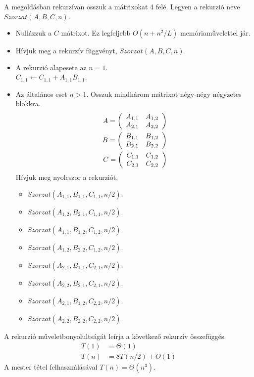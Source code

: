 \documentclass[12pt]{report}
\begin{document}
A megoldásban rekurzívan osszuk a mátrixokat 4 felé.
Legyen a rekurzió neve $Szorzat(A, B, C, n)$.
\begin{itemize}
\item Nullázzuk a $C$ mátrixot.
Ez legfeljebb $O(n+n^2/L)$ memóriaművelettel jár.
\item Hívjuk meg a rekurzív függvényt, $Szorzat(A, B, C, n)$.
\item A rekurzió alapesete az $n=1$. \\
$C_{1,1} \leftarrow C_{1,1} + A_{1,1} B_{1,1}$.
\item Az általános eset $n > 1$.
Osszuk mindhárom mátrixot négy-négy négyzetes blokkra.
\begin{align*}
A=\left(
\begin{array}{c c}  
A_{1,1} & A_{1,2} \\
A_{2,1} & A_{2,2}
\end{array}
\right) \\
B=\left(
\begin{array}{c c}  
B_{1,1} & B_{1,2} \\
B_{2,1} & B_{2,2}
\end{array}
\right) \\
C=\left(
\begin{array}{c c}  
C_{1,1} & C_{1,2} \\
C_{2,1} & C_{2,2}
\end{array}
\right)
\end{align*}
Hívjuk meg nyolcszor a rekurziót.
\begin{itemize}
\item $Szorzat(A_{1,1}, B_{1,1}, C_{1,1}, n/2)$.
\item $Szorzat(A_{1,2}, B_{2,1}, C_{1,1}, n/2)$.
\item $Szorzat(A_{1,1}, B_{1,2}, C_{1,2}, n/2)$.
\item $Szorzat(A_{1,2}, B_{2,2}, C_{1,2}, n/2)$.
\item $Szorzat(A_{2,1}, B_{1,1}, C_{2,1}, n/2)$.
\item $Szorzat(A_{2,2}, B_{2,1}, C_{2,1}, n/2)$.
\item $Szorzat(A_{2,1}, B_{1,2}, C_{2,2}, n/2)$.
\item $Szorzat(A_{2,2}, B_{2,2}, C_{2,2}, n/2)$.
\end{itemize}
\end{itemize}

A rekurzió műveletbonyolultságát leírja a következő rekurzív összefüggés.
\begin{align*}
T(1) &= \Theta(1) \\
T(n) &= 8 T(n/2) + \Theta(1)
\end{align*}
A mester tétel\cite{algoritmusok} felhasználásával $T(n)=\Theta(n^3)$.
\end{document}
